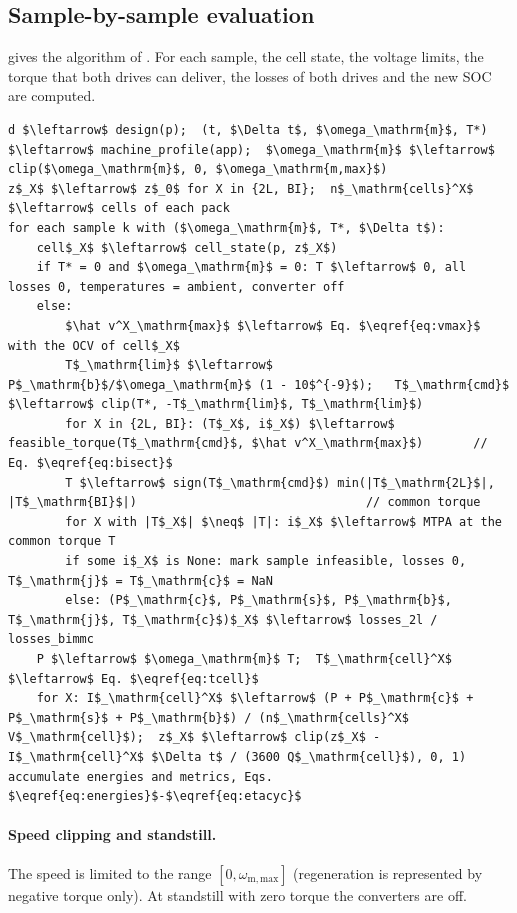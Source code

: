 \subsection{Sample-by-sample evaluation}\label{sec:eval}
 gives the algorithm of . For each sample, the cell state, the voltage limits, the torque that both drives can deliver, the losses of both drives and the new SOC are computed.

\begin{lstlisting}[caption={Cycle evaluation (\code{cycle_eval.evaluate_cycle}) from initial SOC $z_0$.}, label={alg:cycle}]
d $\leftarrow$ design(p);  (t, $\Delta t$, $\omega_\mathrm{m}$, T*) $\leftarrow$ machine_profile(app);  $\omega_\mathrm{m}$ $\leftarrow$ clip($\omega_\mathrm{m}$, 0, $\omega_\mathrm{m,max}$)
z$_X$ $\leftarrow$ z$_0$ for X in {2L, BI};  n$_\mathrm{cells}^X$ $\leftarrow$ cells of each pack
for each sample k with ($\omega_\mathrm{m}$, T*, $\Delta t$):
    cell$_X$ $\leftarrow$ cell_state(p, z$_X$)
    if T* = 0 and $\omega_\mathrm{m}$ = 0: T $\leftarrow$ 0, all losses 0, temperatures = ambient, converter off
    else:
        $\hat v^X_\mathrm{max}$ $\leftarrow$ Eq. $\eqref{eq:vmax}$ with the OCV of cell$_X$
        T$_\mathrm{lim}$ $\leftarrow$ P$_\mathrm{b}$/$\omega_\mathrm{m}$ (1 - 10$^{-9}$);   T$_\mathrm{cmd}$ $\leftarrow$ clip(T*, -T$_\mathrm{lim}$, T$_\mathrm{lim}$)
        for X in {2L, BI}: (T$_X$, i$_X$) $\leftarrow$ feasible_torque(T$_\mathrm{cmd}$, $\hat v^X_\mathrm{max}$)       // Eq. $\eqref{eq:bisect}$
        T $\leftarrow$ sign(T$_\mathrm{cmd}$) min(|T$_\mathrm{2L}$|, |T$_\mathrm{BI}$|)                                // common torque
        for X with |T$_X$| $\neq$ |T|: i$_X$ $\leftarrow$ MTPA at the common torque T
        if some i$_X$ is None: mark sample infeasible, losses 0, T$_\mathrm{j}$ = T$_\mathrm{c}$ = NaN
        else: (P$_\mathrm{c}$, P$_\mathrm{s}$, P$_\mathrm{b}$, T$_\mathrm{j}$, T$_\mathrm{c}$)$_X$ $\leftarrow$ losses_2l / losses_bimmc
    P $\leftarrow$ $\omega_\mathrm{m}$ T;  T$_\mathrm{cell}^X$ $\leftarrow$ Eq. $\eqref{eq:tcell}$
    for X: I$_\mathrm{cell}^X$ $\leftarrow$ (P + P$_\mathrm{c}$ + P$_\mathrm{s}$ + P$_\mathrm{b}$) / (n$_\mathrm{cells}^X$ V$_\mathrm{cell}$);  z$_X$ $\leftarrow$ clip(z$_X$ - I$_\mathrm{cell}^X$ $\Delta t$ / (3600 Q$_\mathrm{cell}$), 0, 1)
accumulate energies and metrics, Eqs. $\eqref{eq:energies}$-$\eqref{eq:etacyc}$
\end{lstlisting}

\paragraph{Speed clipping and standstill.} The speed is limited to the range $[0,\omega_\mathrm{m,max}]$ (regeneration is represented by negative torque only). At standstill with zero torque the converters are off.

